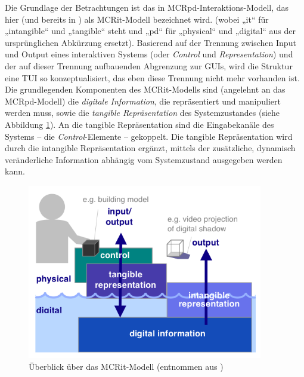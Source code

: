 Die Grundlage der Betrachtungen ist das in \citep{Ullmer00} MCRpd-Interaktions-Modell, das hier (und bereits in \citep{Ullmer05}) als \gls{MCRit}-Modell bezeichnet wird. (wobei „it“ für „intangible“ und „tangible“ steht und „pd“ für „physical“ und „digital“ aus der ursprünglichen Abkürzung ersetzt). Basierend auf der Trennung zwischen Input und Output eines interaktiven Systems (oder \emph{Control} und \emph{Representation}) und der auf dieser Trennung aufbauenden Abgrenzung zur \glspl{GUI}, wird die Struktur eine \gls{TUI} so konzeptualisiert, das eben diese Trennung nicht mehr vorhanden ist. Die grundlegenden Komponenten des \gls{MCRit}-Modells sind (angelehnt an das \gls{MCRpd}-Modell) die \emph{digitale Information}, die repräsentiert und manipuliert werden muss, sowie die \emph{tangible Repräsentation} des Systemzustandes (siehe Abbildung \ref{fig:img_ImplementierungUeberblick_MCRit}). An die tangible Repräsentation sind die Eingabekanäle des Systems -- die \emph{Control}-Elemente -- gekoppelt. Die tangible Repräsentation wird durch die intangible Repräsentation ergänzt, mittels der zusätzliche, dynamisch veränderliche Information abhängig vom Systemzustand ausgegeben werden kann.

\begin{figure}[htbp]
	\centering
		\includegraphics[height=3in]{img/ImplementierungUeberblick/MCRit.png}
	\caption[Überblick über das MCRit-Modell]{Überblick über das MCRit-Modell (entnommen aus \citet{Ishii08})}
	\label{fig:img_ImplementierungUeberblick_MCRit}
\end{figure}

